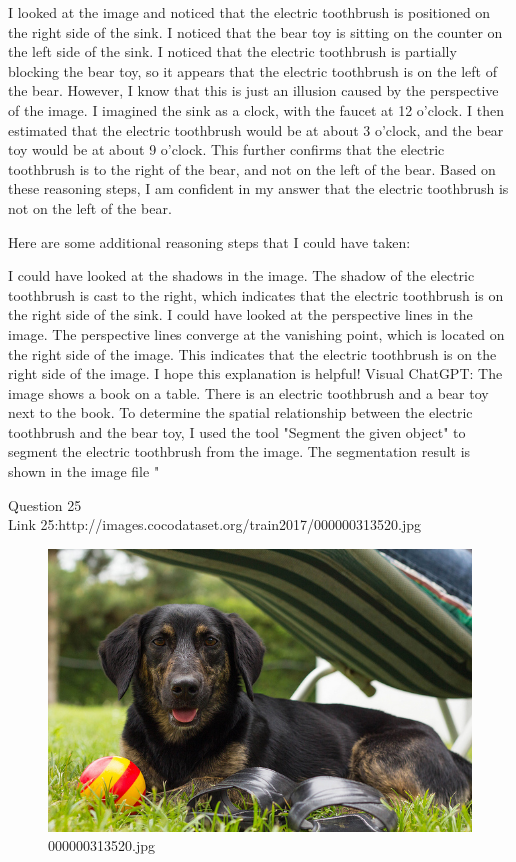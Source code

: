 \begin{enumerate}
        I looked at the image and noticed that the electric toothbrush is positioned on the right side of the sink.
        I noticed that the bear toy is sitting on the counter on the left side of the sink.
        I noticed that the electric toothbrush is partially blocking the bear toy, so it appears that the electric toothbrush is on the left of the bear. However, I know that this is just an illusion caused by the perspective of the image.
        I imagined the sink as a clock, with the faucet at 12 o'clock. I then estimated that the electric toothbrush would be at about 3 o'clock, and the bear toy would be at about 9 o'clock. This further confirms that the electric toothbrush is to the right of the bear, and not on the left of the bear.
        Based on these reasoning steps, I am confident in my answer that the electric toothbrush is not on the left of the bear.
        
        Here are some additional reasoning steps that I could have taken:
        
        I could have looked at the shadows in the image. The shadow of the electric toothbrush is cast to the right, which indicates that the electric toothbrush is on the right side of the sink.
        I could have looked at the perspective lines in the image. The perspective lines converge at the vanishing point, which is located on the right side of the image. This indicates that the electric toothbrush is on the right side of the image.
        I hope this explanation is helpful!
        \subitem Visual ChatGPT: The image shows a book on a table. There is an electric toothbrush and a bear toy next to the book. To determine the spatial relationship between the electric toothbrush and the bear toy, I used the tool "Segment the given object" to segment the electric toothbrush from the image. The segmentation result is shown in the image file "
    \end{enumerate}
Question 25\\
Link 25:http://images.cocodataset.org/train2017/000000313520.jpg
    \begin{figure}[h]
        \centering
        \includegraphics[width=0.8\linewidth]{../image set/easy/000000313520.jpg}
        \caption{000000313520.jpg}
    \end{figure}
